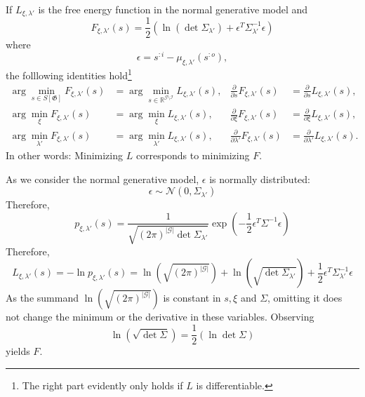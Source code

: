 \documentclass[a4paper,11pt]{report}
\begin{document}
\begin{Pro}\label{pro:free-energy-normal}
If $L_{\xi,\lambda'}$ is the free energy function in the normal generative model and
\begin{equation}
F_{\xi,\lambda'}(s)=
\frac12\left(\ln\left(\det\Sigma_{\lambda'}\right)+\epsilon^{T}\Sigma_{\lambda'}^{-1}\epsilon\right)
\end{equation}
where
\[
\epsilon=s^{:i}-\mu_{\xi,\lambda'}(s^{:o}), 
\]
the folllowing identities hold\footnote{
The right part evidently only holds if $L$ is differentiable.}
\begin{align}
\arg\min_{s\in S[\mathfrak{G}]}F_{\xi,\lambda'}(s)&=\arg\min_{s\in\mathbb{R}^{\mathcal{G}\setminus\mathcal{I}}}L_{\xi,\lambda'}(s),&
\frac{\partial}{\partial s}F_{\xi,\lambda'}(s)&=\frac{\partial}{\partial s}L_{\xi,\lambda'}(s),\\
\arg\min_{\xi}F_{\xi,\lambda'}(s)&=\arg\min_{\xi}L_{\xi,\lambda'}(s),&
\frac{\partial}{\partial \xi}F_{\xi,\lambda'}(s)&=\frac{\partial}{\partial \xi}L_{\xi,\lambda'}(s),\\
\arg\min_{\lambda'}F_{\xi,\lambda'}(s)&=\arg\min_{\lambda'}L_{\xi,\lambda'}(s),&
\frac{\partial}{\partial \lambda'}F_{\xi,\lambda'}(s)&=\frac{\partial}{\partial \lambda'}L_{\xi,\lambda'}(s).
\end{align}
In other words: Minimizing $L$ corresponds to minimizing $F$.
\end{Pro}

\begin{Bew}
As we consider the normal generative model, $\epsilon$ is normally distributed:
\[
\epsilon\sim\mathcal{N}(0,\Sigma_{\lambda'})
\]
Therefore, 
\[
p_{\xi,\lambda'}(s)=\frac{1}{\sqrt{(2\pi)^{|\mathcal{G}|}\det\Sigma_{\lambda'}}}\exp\left(-\frac12\epsilon^T\Sigma^{-1}\epsilon\right)
\]
Therefore, 
\[
L_{\xi,\lambda'}(s)=-\ln p_{\xi,\lambda'}(s)=\ln\left(\sqrt{(2\pi)^{|\mathcal{G}|}}\right)+\ln\left(\sqrt{\det\Sigma_{\lambda'}}\right)+\frac12\epsilon^T\Sigma_{\lambda'}^{-1}\epsilon
\]
As the summand $\ln\left(\sqrt{(2\pi)^{|\mathcal{G}|}}\right)$ is constant in $s,\xi$ and $\Sigma$, omitting it does not change the minimum or the derivative in these variables. Observing
\[
\ln\left(\sqrt{\det\Sigma}\right)=\frac12\left(\ln\det\Sigma\right)
\]
yields $F$.
\end{Bew}
\end{document}
